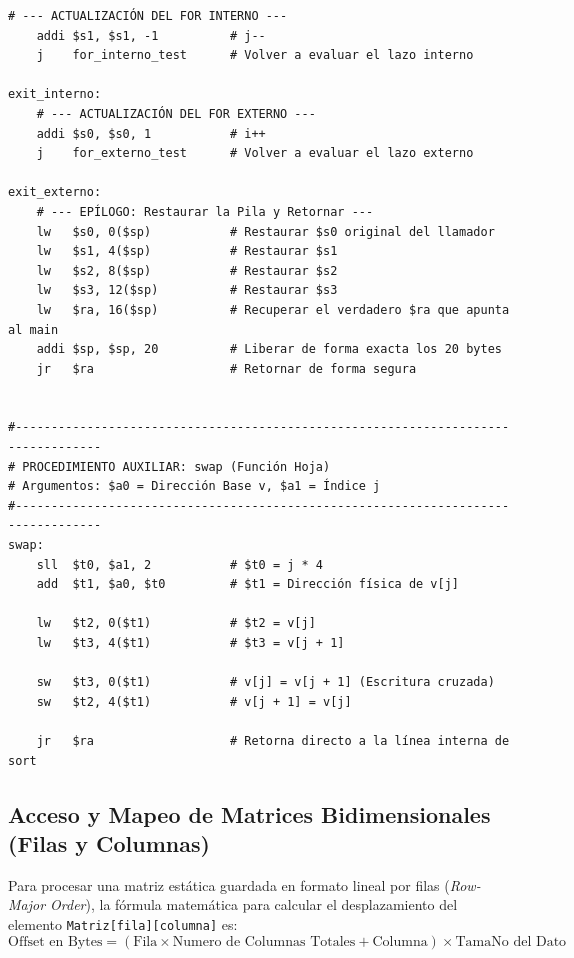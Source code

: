 \documentclass[11pt,letterpaper]{article}
\begin{document}
\begin{lstlisting}[caption={Código máquina MIPS completo para la rutina sort y sub-rutina swap.}]
    # --- ACTUALIZACIÓN DEL FOR INTERNO ---
    addi $s1, $s1, -1          # j--
    j    for_interno_test      # Volver a evaluar el lazo interno

exit_interno:
    # --- ACTUALIZACIÓN DEL FOR EXTERNO ---
    addi $s0, $s0, 1           # i++
    j    for_externo_test      # Volver a evaluar el lazo externo

exit_externo:
    # --- EPÍLOGO: Restaurar la Pila y Retornar ---
    lw   $s0, 0($sp)           # Restaurar $s0 original del llamador
    lw   $s1, 4($sp)           # Restaurar $s1
    lw   $s2, 8($sp)           # Restaurar $s2
    lw   $s3, 12($sp)          # Restaurar $s3
    lw   $ra, 16($sp)          # Recuperar el verdadero $ra que apunta al main
    addi $sp, $sp, 20          # Liberar de forma exacta los 20 bytes
    jr   $ra                   # Retornar de forma segura


#----------------------------------------------------------------------------------
# PROCEDIMIENTO AUXILIAR: swap (Función Hoja)
# Argumentos: $a0 = Dirección Base v, $a1 = Índice j
#----------------------------------------------------------------------------------
swap:
    sll  $t0, $a1, 2           # $t0 = j * 4
    add  $t1, $a0, $t0         # $t1 = Dirección física de v[j]
    
    lw   $t2, 0($t1)           # $t2 = v[j]
    lw   $t3, 4($t1)           # $t3 = v[j + 1]
    
    sw   $t3, 0($t1)           # v[j] = v[j + 1] (Escritura cruzada)
    sw   $t2, 4($t1)           # v[j + 1] = v[j]
    
    jr   $ra                   # Retorna directo a la línea interna de sort
\end{lstlisting}

\subsection{Acceso y Mapeo de Matrices Bidimensionales (Filas y Columnas)}
Para procesar una matriz estática guardada en formato lineal por filas (\textit{Row-Major Order}), la fórmula matemática para calcular el desplazamiento del elemento \texttt{Matriz[fila][columna]} es:
\begin{equation}
\text{Offset en Bytes} = (\text{Fila} \times \text{Numero de Columnas Totales} + \text{Columna}) \times \text{TamaNo del Dato}
\end{equation}
\end{document}
